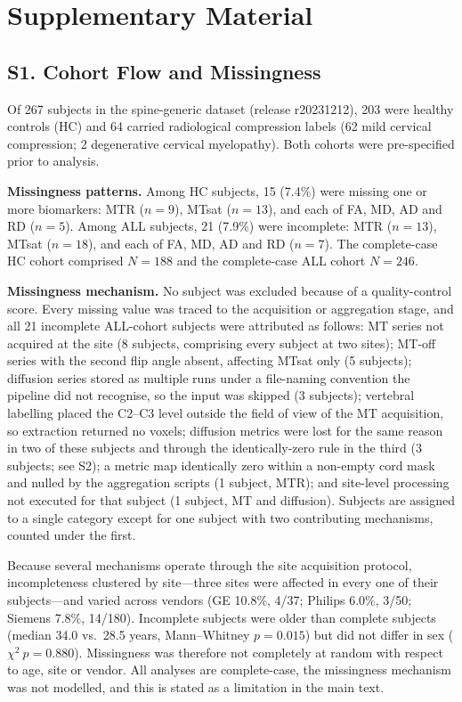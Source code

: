 \documentclass[12pt,a4paper]{article}
\begin{document}
\section*{Supplementary Material}

\subsection*{S1. Cohort Flow and Missingness}

Of 267 subjects in the spine-generic dataset (release r20231212), 203 were healthy controls (HC) and 64 carried radiological compression labels (62 mild cervical compression; 2 degenerative cervical myelopathy). Both cohorts were pre-specified prior to analysis.

\textbf{Missingness patterns.} Among HC subjects, 15 (7.4\%) were missing one or more biomarkers: MTR ($n=9$), MTsat ($n=13$), and each of FA, MD, AD and RD ($n=5$). Among ALL subjects, 21 (7.9\%) were incomplete: MTR ($n=13$), MTsat ($n=18$), and each of FA, MD, AD and RD ($n=7$). The complete-case HC cohort comprised $N=188$ and the complete-case ALL cohort $N=246$.

\textbf{Missingness mechanism.} No subject was excluded because of a quality-control score. Every missing value was traced to the acquisition or aggregation stage, and all 21 incomplete ALL-cohort subjects were attributed as follows: MT series not acquired at the site (8 subjects, comprising every subject at two sites); MT-off series with the second flip angle absent, affecting MTsat only (5 subjects); diffusion series stored as multiple runs under a file-naming convention the pipeline did not recognise, so the input was skipped (3 subjects); vertebral labelling placed the C2--C3 level outside the field of view of the MT acquisition, so extraction returned no voxels; diffusion metrics were lost for the same reason in two of these subjects and through the identically-zero rule in the third (3 subjects; see S2); a metric map identically zero within a non-empty cord mask and nulled by the aggregation scripts (1 subject, MTR); and site-level processing not executed for that subject (1 subject, MT and diffusion). Subjects are assigned to a single category except for one subject with two contributing mechanisms, counted under the first.

Because several mechanisms operate through the site acquisition protocol, incompleteness clustered by site---three sites were affected in every one of their subjects---and varied across vendors (GE 10.8\%, 4/37; Philips 6.0\%, 3/50; Siemens 7.8\%, 14/180). Incomplete subjects were older than complete subjects (median 34.0 vs.\ 28.5 years, Mann--Whitney $p=0.015$) but did not differ in sex ($\chi^2\ p=0.880$). Missingness was therefore not completely at random with respect to age, site or vendor. All analyses are complete-case, the missingness mechanism was not modelled, and this is stated as a limitation in the main text.
\end{document}
